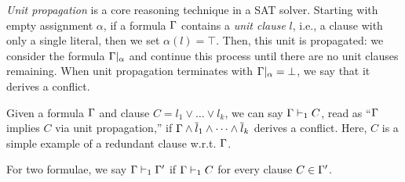 %
%
%
\emph{Unit propagation} is a core reasoning technique in a SAT solver. Starting with empty assignment $\alpha$, if a formula $\Gamma$ contains a \emph{unit clause} $l$, i.e., a clause with only a single literal, then we set $\alpha(l) = \top$. Then, this unit is propagated: we consider the formula $\Gamma|_\alpha$ and continue this process until there are no unit clauses remaining. When unit propagation terminates with $\Gamma|_\alpha = \bot$, we say that it derives a conflict.
%
%

Given a formula $\Gamma$ and clause $C = l_1 \lor \dots \lor l_k$, we can say $\Gamma \vdash_1 C$, read as ``$\Gamma$ implies $C$ via unit propagation,'' if $\Gamma \land \overline{l}_1 \land \dots \land \overline{l}_k$ derives a conflict. Here, $C$ is a simple example of a redundant clause w.r.t. $\Gamma$. 

For two formulae, we say $\Gamma \vdash_1 \Gamma'$ if $\Gamma \vdash_1 C$ for every clause $C \in \Gamma'$. 

